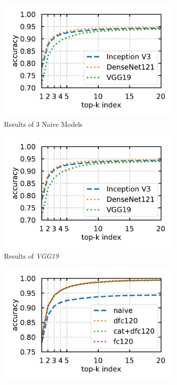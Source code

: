\documentclass{article}
\begin{document}
\begin{figure}[htb]
	\centering
	\label{fig:res}
	\begin{subfigure}{0.48\linewidth}
		\centering
		\includegraphics[width=\linewidth]{pics/Model_naive}
		\caption{Results of $3$ Naive Models}
		\label{fig:all3}
	\end{subfigure} 
	\begin{subfigure}{0.48\linewidth}
		\centering
		\includegraphics[width=\linewidth]{pics/Model_naive}
		\caption{Results of \emph{VGG19}}
		\label{fig:vgg19}
	\end{subfigure} 
	\begin{subfigure}{0.48\linewidth}
		\centering
		\includegraphics[width=\linewidth]{pics/InceptionV3}

\end{subfigure}
\end{figure}
\end{document}
